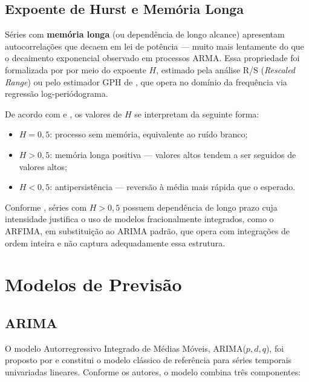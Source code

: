 \documentclass[
  12pt,
  openright,
  twoside,
  a4paper,
  english,
  brazil
]{abntex2}
\begin{document}
\subsection{Expoente de Hurst e Memória Longa}
\label{subsec:hurst}

Séries com \textbf{memória longa} (ou dependência de longo alcance) apresentam autocorrelações que decaem em lei de potência — muito mais lentamente do que o decaimento exponencial observado em processos ARMA. Essa propriedade foi formalizada por  por meio do expoente $H$, estimado pela análise R/S (\textit{Rescaled Range}) ou pelo estimador GPH de , que opera no domínio da frequência via regressão log-periódograma.

De acordo com  e , os valores de $H$ se interpretam da seguinte forma:

\begin{itemize}
  \item $H = 0{,}5$: processo sem memória, equivalente ao ruído branco;
  \item $H > 0{,}5$: memória longa positiva — valores altos tendem a ser seguidos de valores altos;
  \item $H < 0{,}5$: antipersistência — reversão à média mais rápida que o esperado.
\end{itemize}

Conforme , séries com $H > 0{,}5$ possuem dependência de longo prazo cuja intensidade justifica o uso de modelos fracionalmente integrados, como o ARFIMA, em substituição ao ARIMA padrão, que opera com integrações de ordem inteira e não captura adequadamente essa estrutura.

\section{Modelos de Previsão}
\label{sec:modelos-previsao}

\subsection{ARIMA}
\label{subsec:arima}

O modelo Autorregressivo Integrado de Médias Móveis, ARIMA($p, d, q$), foi proposto por  e constitui o modelo clássico de referência para séries temporais univariadas lineares. Conforme os autores, o modelo combina três componentes:
\end{document}
